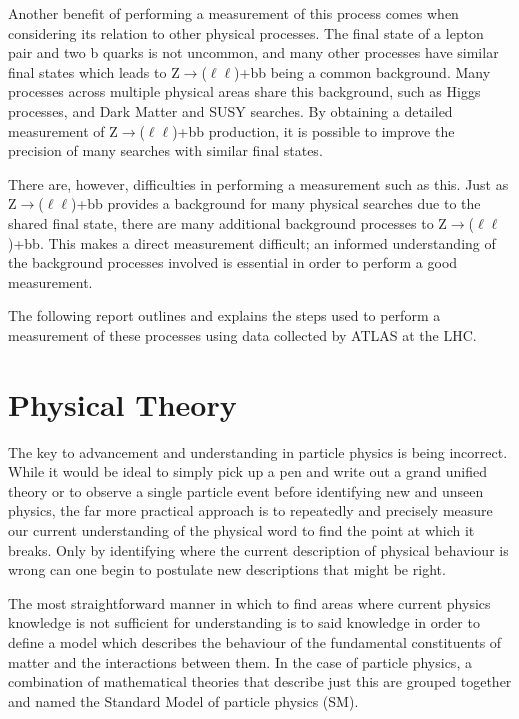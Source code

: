 \documentclass[12pt,a4paper,epsf,portrait,times,epsfig]{article}
\begin{document}
	Another benefit of performing a measurement of this process comes when considering its relation to other physical processes. The final state of a lepton pair and two b quarks is not	uncommon, and many other processes have similar final states which leads to Z$\rightarrow$($\ell\ell$)+bb being a common background. Many processes across multiple physical areas share this background, such as Higgs processes, and Dark Matter and SUSY searches. By obtaining a detailed measurement of Z$\rightarrow$($\ell\ell$)+bb production, it is possible to improve the precision
	of many searches with similar final states. \par

	There are, however, difficulties in performing a measurement such as this. Just as Z$\rightarrow$($\ell\ell$)+bb provides a background for many physical searches due to the shared final state, there are many additional background processes to Z$\rightarrow$($\ell\ell$)+bb. This makes a direct measurement difficult; an informed understanding of the background processes involved is essential in order to perform a good measurement. \par

	The following report outlines and explains the steps used to perform a measurement of these processes using data collected by ATLAS at the LHC.

	\newpage
	
	\section{Physical Theory}
	
	The key to advancement and understanding in particle physics is being incorrect. While it would be ideal to simply pick up a pen and write out a grand unified theory or to observe a single particle event before identifying new and unseen physics, the far more practical approach is to repeatedly and precisely measure our current understanding of the physical word to find the point at which it breaks. Only by identifying where the current description of physical behaviour is wrong can one begin to postulate new descriptions that might be right. \par

	The most straightforward manner in which to find areas where current physics knowledge is not sufficient for understanding is to said knowledge in order to define a model which describes the behaviour of the fundamental constituents of matter and the interactions between them. In the case of particle physics, a combination of mathematical theories that describe just this are grouped together and named the Standard Model of particle physics (SM). 
\end{document}
